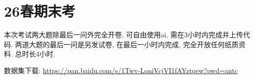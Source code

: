 
\section{26春期末考}

本次考试两大题除最后一问外完全开卷, 可自由使用ai, 需在3小时内完成并上传代码. 两道大题的最后一问是另发试卷, 在最后一小时内完成, 完全开放任何纸质资料. 总时长4小时.

数据集下载: \url{https://pan.baidu.com/s/1Twv-LoniVcjVI1fAYztqew?pwd=antc}

